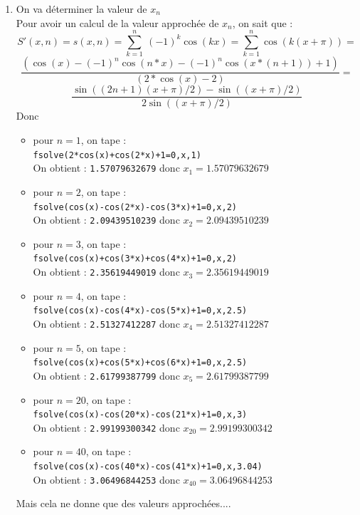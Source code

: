\documentclass[a4paper,11pt]{book}
\begin{document}
\begin{enumerate}
\item On va d\'eterminer la valeur de $x_n$\\
Pour avoir un calcul de la valeur approch\'ee de $x_n$, on sait que :
$$S'(x,n)=s(x,n)=\sum_{k=1}^n \ (-1)^k \cos(kx)=\sum_{k=1}^n \cos(k(x+\pi))=$$
$$\frac{(\cos(x)-(-1)^n\cos(n*x)-(-1)^n\cos(x*(n+1))+1)}{(2*\cos(x)-2)}=$$
$$ \frac{\sin((2n+1)(x+\pi)/2)-\sin((x+\pi)/2)}{2\sin((x+\pi)/2)}$$
Donc
\begin{itemize}
\item  pour $n=1$, on tape :\\
{\tt fsolve(2*cos(x)+cos(2*x)+1=0,x,1)}\\
On obtient : {\tt 1.57079632679} donc $x_1=1.57079632679$
\item  pour $n=2$, on tape :\\
{\tt fsolve(cos(x)-cos(2*x)-cos(3*x)+1=0,x,2)}\\
On obtient : {\tt 2.09439510239} donc $x_2=2.09439510239$
\item  pour $n=3$, on tape :\\
{\tt fsolve(cos(x)+cos(3*x)+cos(4*x)+1=0,x,2)}\\
On obtient : {\tt 2.35619449019} donc $x_3=2.35619449019$
\item  pour $n=4$, on tape :\\
{\tt fsolve(cos(x)-cos(4*x)-cos(5*x)+1=0,x,2.5)}\\
On obtient : {\tt 2.51327412287} donc $x_4=2.51327412287$
\item  pour $n=5$, on tape :\\
{\tt fsolve(cos(x)+cos(5*x)+cos(6*x)+1=0,x,2.5)}\\
On obtient : {\tt 2.61799387799} donc $x_5=2.61799387799$
\item  pour $n=20$, on tape :\\
{\tt fsolve(cos(x)-cos(20*x)-cos(21*x)+1=0,x,3)}\\
On obtient : {\tt 2.99199300342} donc $x_{20}=2.99199300342$
\item  pour $n=40$, on tape :\\
{\tt fsolve(cos(x)-cos(40*x)-cos(41*x)+1=0,x,3.04)}\\
On obtient : {\tt 3.06496844253} donc $x_{40}=3.06496844253$
\end{itemize}
Mais cela ne donne que des valeurs approch\'ees....


\end{enumerate}
\end{document}
